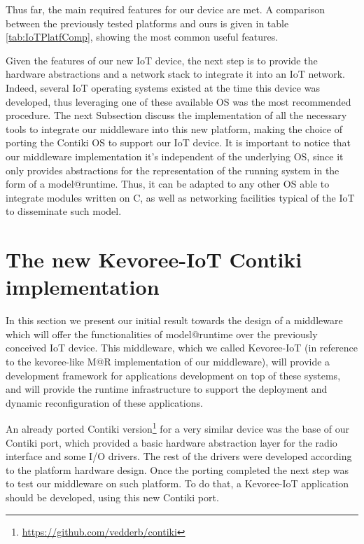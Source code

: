 Thus far, the main required features for our device are met.
A comparison between the previously tested platforms and ours is given in table \ref{tab:IoTPlatfComp}, showing the most common useful features.

Given the features of our new IoT device, the next step is to provide the hardware abstractions and a network stack to integrate it into an IoT network.
Indeed, several IoT operating systems existed at the time this device was developed, thus leveraging one of these available OS was the most recommended procedure.
The next Subsection discuss the implementation of all the necessary tools to integrate our middleware into this new platform, making the choice of porting the Contiki OS to support our IoT device.
It is important to notice that our middleware implementation it's independent of the underlying OS, since it only provides abstractions for the representation of the running system in the form of a model@runtime.
Thus, it can be adapted to any other OS able to integrate modules written on C, as well as networking facilities typical of the IoT to disseminate such model.

\section{The new Kevoree-IoT Contiki implementation}
\label{subsec:kevoreeContikiImpl}
In this section we present our initial result towards the design of a middleware which will offer the functionalities of model@runtime over the previously conceived IoT device. 
This middleware, which we called Kevoree-IoT (in reference to the kevoree-like M@R implementation of our middleware), will provide a development framework for applications development on top of these systems, and will provide the runtime infrastructure to support the deployment and dynamic reconfiguration of these applications.

An already ported Contiki version\footnote{\url{https://github.com/vedderb/contiki}} for a very similar device was the base of our Contiki port, which provided a basic hardware abstraction layer for the radio interface and some I/O drivers.
The rest of the drivers were developed according to the platform hardware design.
Once the porting completed the next step was to test our middleware on such platform.
To do that, a Kevoree-IoT application should be developed, using this new Contiki port.


